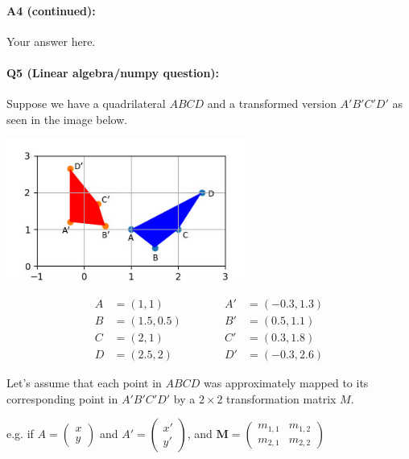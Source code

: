 
\pagebreak
\paragraph{A4 (continued):} Your answer here.


\pagebreak
\paragraph{Q5 (Linear algebra/numpy question):}
Suppose we have a quadrilateral $ABCD$ and a transformed version $A'B'C'D'$ as seen in the image below.

\includegraphics[width=8cm]{quadrilaterals.jpg}

\begin{equation}
\begin{split}
A&=(1, 1)\\
B&=(1.5, 0.5)\\
C&=(2, 1)\\
D&=(2.5, 2)
\end{split}
\quad\quad\quad
\begin{split}
A'&=(-0.3, 1.3)\\
B'&=(0.5, 1.1)\\
C'&=(0.3, 1.8)\\
D'&=(-0.3, 2.6)
\end{split}
\end{equation}

Let's assume that each point in $ABCD$ was approximately mapped to its corresponding point in $A'B'C'D'$ by a $2\times2$ transformation matrix $M$.

e.g. if $A = \begin{pmatrix} x \\ y \end{pmatrix}$ and $A' = \begin{pmatrix} x' \\ y' \end{pmatrix}$, and $\boldsymbol{M} = \begin{pmatrix} m_{1,1} & m_{1,2} \\ m_{2,1} & m_{2,2} \end{pmatrix}$

